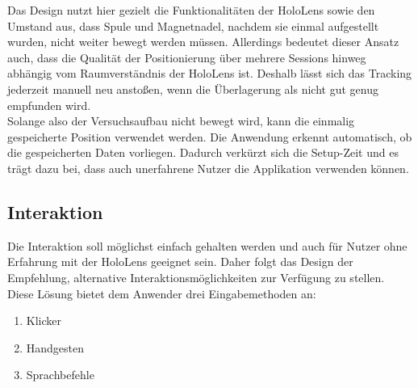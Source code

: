 Das Design nutzt hier gezielt die Funktionalitäten der HoloLens sowie den Umstand aus, dass Spule und Magnetnadel, nachdem sie einmal aufgestellt wurden, nicht weiter bewegt werden müssen. Allerdings bedeutet dieser Ansatz auch, dass die Qualität der Positionierung über mehrere Sessions hinweg abhängig vom Raumverständnis der HoloLens ist. Deshalb lässt sich das Tracking jederzeit manuell neu anstoßen, wenn die Überlagerung als nicht gut genug empfunden wird.\\

Solange also der Versuchsaufbau nicht bewegt wird, kann die einmalig gespeicherte Position verwendet werden. Die Anwendung erkennt automatisch, ob die gespeicherten Daten vorliegen. Dadurch verkürzt sich die Setup-Zeit und es trägt dazu bei, dass auch unerfahrene Nutzer die Applikation verwenden können.\\

\subsection{Interaktion}
Die Interaktion soll möglichst einfach gehalten werden und auch für Nutzer ohne Erfahrung mit der HoloLens geeignet sein. Daher folgt das Design der Empfehlung, alternative Interaktionsmöglichkeiten zur Verfügung zu stellen. Diese Lösung bietet dem Anwender drei Eingabemethoden an:
\begin{enumerate}
	\setlength{\itemsep}{-5pt}
	\item Klicker
	\item Handgesten
	\item Sprachbefehle
\end{enumerate}

\vspace{8px}
\begin{center}
	\\
\end{center}
\vspace{6px}


